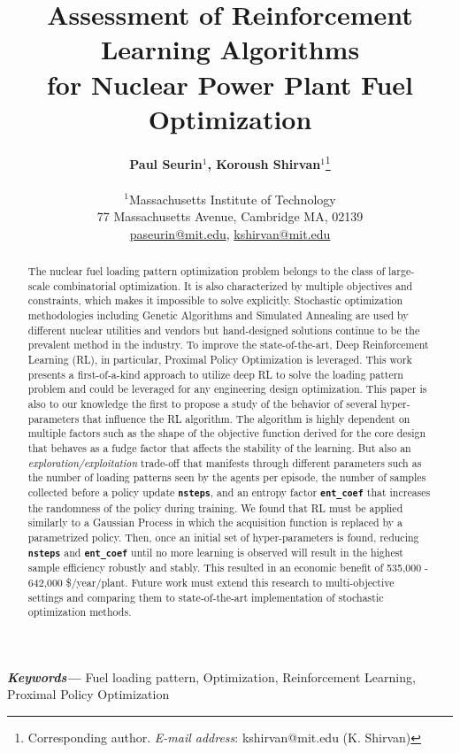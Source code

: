 \documentclass[a4paper]{article}
\title{Assessment of Reinforcement Learning Algorithms \\ for Nuclear Power Plant Fuel Optimization}
\author{
  \textbf{Paul Seurin$^1$, Koroush Shirvan$^1$}\footnote{Corresponding author. \textit{E-mail address}: kshirvan@mit.edu (K. Shirvan)} \\
  \\
  $^1$Massachusetts Institute of Technology \\
77 Massachusetts Avenue, Cambridge MA, 02139
\\ 
  \url{paseurin@mit.edu}, \url{kshirvan@mit.edu}
}
\date{} %
\newcommand{\code}[1]{\colorbox{light-gray}{\small\color{blue}\textbf{\texttt{#1}}}}
\providecommand{\keywords}[1]
{
  \small	
  \textbf{\textit{Keywords---}} #1
}
\begin{document}
\maketitle


\justify 
\begin{abstract}
The nuclear fuel loading pattern optimization problem belongs to the class
of large-scale combinatorial optimization. It is also characterized by multiple objectives and constraints, which makes it impossible to solve explicitly. Stochastic optimization methodologies including Genetic Algorithms and Simulated Annealing are used by different nuclear utilities and vendors but hand-designed solutions continue to be the prevalent method in the industry. To improve the state-of-the-art, Deep Reinforcement Learning (RL), in particular, Proximal Policy Optimization is leveraged. This work presents a first-of-a-kind approach to utilize deep RL to solve the loading pattern problem and could be leveraged for any engineering design optimization. This paper is also to our knowledge the first to propose a study of the behavior of several hyper-parameters that influence the RL algorithm. The algorithm is highly dependent on multiple factors such as the shape of the objective function derived for the core design that behaves as a fudge factor that affects the stability of the learning. But also an \textit{exploration/exploitation} trade-off that manifests through different parameters such as the number of loading patterns seen by the agents per episode, 
the number of samples collected before a policy update \code{nsteps}, and an entropy factor \code{ent\_coef} that increases the randomness of the policy during training. We found that RL must be applied similarly to a Gaussian Process in which the acquisition function is replaced by a parametrized policy. Then, once an initial set of hyper-parameters is found, reducing \code{nsteps} and \code{ent\_coef} until no more learning is observed will result in the highest sample efficiency robustly and stably. This resulted in an economic benefit of 535,000 - 642,000 \$/year/plant. Future work must extend this research to multi-objective settings and comparing them to state-of-the-art implementation of stochastic optimization methods.
\end{abstract} \hspace{10pt}
\keywords{Fuel loading pattern, Optimization, Reinforcement Learning, Proximal Policy Optimization}
\end{document}
